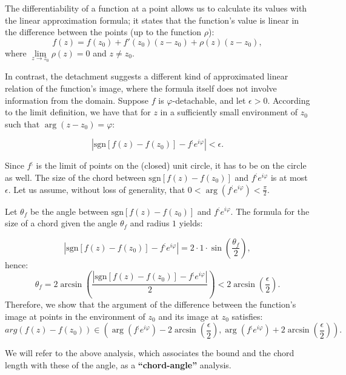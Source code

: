 \documentclass[11pt]{book}
\begin{document}
The differentiability of a function at a point allows us to calculate its values with the linear approximation formula;  it states that the function's value is linear in the difference between the points (up to the function $\rho$):
$$f\left(z\right)=f\left(z_{0}\right)+f'\left(z_{0}\right)\left(z-z_{0}\right)+\rho\left(z\right)\left(z-z_{0}\right),$$
where $\underset{z\to z_{0}}{\lim}\rho\left(z\right)=0$ and $z\neq z_{0}.$

In contrast, the detachment suggests a different kind of approximated linear relation of the function's image, where the formula itself does not involve information from the domain. Suppose $f$ is $\varphi$-detachable, and let $\epsilon>0.$ According to the limit definition, we have that for $z$ in a sufficiently small environment of $z_{0}$ such that $\arg\left(z-z_{0}\right)=\varphi$:

$$\left|\text{sgn}\left[f\left(z\right)-f\left(z_{0}\right)\right]-f^{;} e^{i\varphi} \right|<\epsilon.$$

Since $f^{;}$ is the limit of points on the (closed) unit circle, it has to be on the circle as well. The size of the chord between $\text{sgn}\left[f\left(z\right)-f\left(z_{0}\right)\right]$ and $f^{;}e^{i\varphi}$ is at most $\epsilon.$ Let us assume, without loss of generality, that $0<\arg\left(f^{;}e^{i\varphi}\right)<\frac{\pi}{2}.$

Let $\theta_{f}$ be the angle between $\text{sgn}\left[f\left(z\right)-f\left(z_{0}\right)\right]$ and $f^{;}e^{i\varphi}.$ The formula for the size of a chord given the angle $\theta_{f}$ and radius $1$ yields:

$$\left|\text{sgn}\left[f\left(z\right)-f\left(z_{0}\right)\right]-f^{;}e^{i\varphi}\right|=2\cdot1\cdot\sin\left(\frac{\theta_{f}}{2}\right),$$
hence:
$$\theta_{f}=2\arcsin\left(\frac{\left|\text{sgn}\left[f\left(z\right)-f\left(z_{0}\right)\right]-f^{;}e^{i\varphi}\right|}{2}\right)<2\arcsin\left(\frac{\epsilon}{2}\right).$$
Therefore, we show that the argument of the difference between the function's image at points in the environment of $z_{0}$ and its image at $z_{0}$ satisfies: $$arg\left(f\left(z\right)-f\left(z_{0}\right)\right)\in\left(\arg\left(f^{;}e^{i\varphi}\right)-2\arcsin\left(\frac{\epsilon}{2}\right),\arg\left(f^{;}e^{i\varphi}\right)+2\arcsin\left(\frac{\epsilon}{2}\right)\right).\label{arg_delta_f_bounds}$$

We will refer to the above analysis, which associates the bound and the chord length with these of the angle, as a \textbf{“chord-angle”} analysis.
\end{document}

